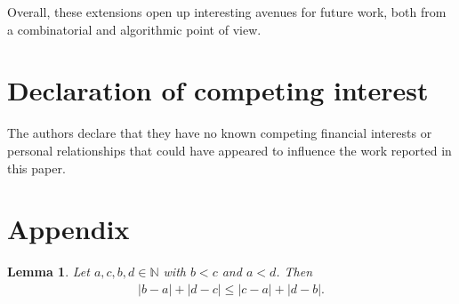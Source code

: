 \documentclass{article}
\newtheorem{lemma}[theorem]{Lemma}
\theoremstyle{definition}
\begin{document}
Overall, these extensions open up interesting avenues for future work, both from a combinatorial and algorithmic point of view.


\section*{Declaration of competing interest}

The authors declare that they have no known competing financial interests or personal relationships that could have appeared to influence the work reported in this paper.

\printbibliography

\appendix
\section{Appendix} \label{sec:appendix}
\begin{lemma}\label{lem:helperequations} %
Let $a,c,b,d \in \mathbb{N}$ with  $b < c$ and $a < d$. Then
\begin{align}
        |b-a| + |d-c| \leq |c-a| + |d-b| . \label{eq:helperequation}
\end{align}

\end{lemma}
\end{document}
